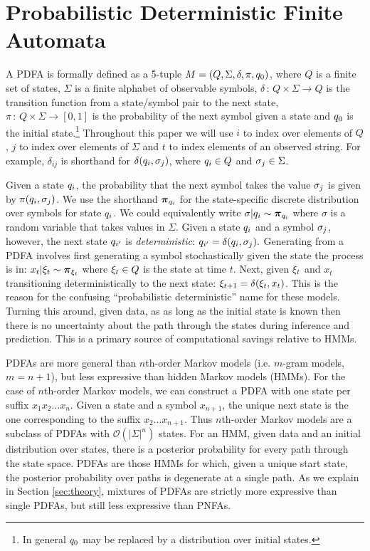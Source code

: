 \section{Probabilistic Deterministic Finite Automata}
\label{sec:PDFA}

A PDFA is formally defined as a 5-tuple $M = (Q,\Sigma,\delta,\pi,\state_0)$, where $Q$ is a finite set of states, $\Sigma$ is a finite alphabet of observable symbols, $\delta\,:\,Q\times\Sigma\rightarrow Q$ is the transition function from a state/symbol pair to the next state, $\pi\,:\,Q\times\Sigma\rightarrow[0,1]$ is the probability of the next symbol given a state and $\state_0$ is the initial state.\footnote{In general $\state_0$ may be replaced by a distribution over initial states.  }  Throughout this paper we will use $i$ to index over elements of $Q$, $j$ to index over elements of $\Sigma$ and $t$ to index elements of an observed string.  For example, $\delta_{ij}$ is shorthand for $\delta(\state_i,\symb_j)$, where $\state_i \in Q$ and $\symb_j \in \Sigma$.

Given a state $\state_i$, the probability that the next symbol takes the value $\symb_j$ is given by $\pi(\state_i,\symb_j)$.  We use the shorthand $\bpi_{q_i}$ for the state-specific discrete distribution over symbols for state $\state_i$.  We could equivalently write $\sigma|\state_i \sim \bpi_{q_i}$ where $\sigma$ is a random variable that takes values in $\Sigma$.  Given a state $\state_i$ and a symbol $\symb_j$, however, the next state $\state_{i'}$ is {\it deterministic}: $\state_{i'} = \delta(\state_i,\symb_j).$   Generating from a PDFA involves first generating a symbol stochastically given the state the process is in: $x_t|\q_t \sim \bpi_{\q_t}$ where $\q_t \in Q$ is the state at time $t$.  Next, given $\q_t$ and $x_t$ transitioning deterministically to the next state: $\q_{t+1} = \delta(\q_t,x_t)$.  This is the reason for the confusing ``probabilistic deterministic'' name for these models.  Turning this around, given data, as as long as the initial state is known then there is no uncertainty about the path through the states during inference and prediction. 
This is a primary source of computational savings relative to HMMs.

PDFAs are more general than $n$th-order Markov models (i.e. $m$-gram models, $m=n+1$), but less expressive than hidden Markov models (HMMs)\cite{Dupont2005}.  For the case of $n$th-order Markov models, we can construct a PDFA with one state per suffix $x_1 x_2 \ldots x_n$.  Given a state and a symbol $x_{n+1}$, the unique next state is the one corresponding to the suffix $x_2 \ldots x_{n+1}$.  Thus $n$th-order Markov models are a subclass of PDFAs with $\mathcal{O}(|\Sigma|^n)$ states.  For an HMM, given data and an initial distribution over states, there is a posterior probability for every path through the state space.  PDFAs are those HMMs for which, given a unique start state, the posterior probability over paths is degenerate at a single path.  As we explain in Section \ref{sec:theory}, mixtures of PDFAs are strictly more expressive than single PDFAs, but still less expressive than PNFAs.